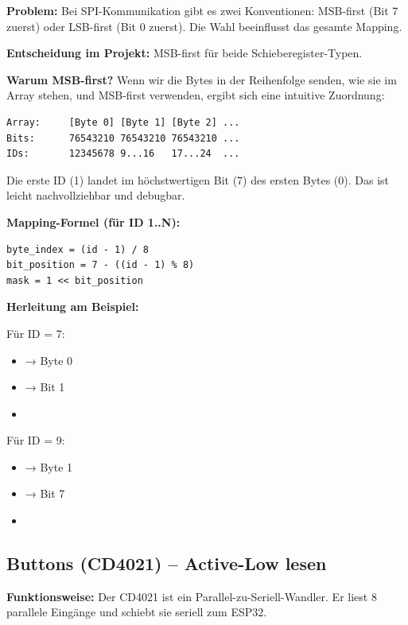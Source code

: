 \textbf{Problem:} Bei SPI-Kommunikation gibt es zwei Konventionen: MSB-first (Bit 7 zuerst) oder LSB-first (Bit 0 zuerst). Die Wahl beeinflusst das gesamte Mapping.

\textbf{Entscheidung im Projekt:} MSB-first für beide Schieberegister-Typen.

\textbf{Warum MSB-first?} Wenn wir die Bytes in der Reihenfolge senden, wie sie im Array stehen, und MSB-first verwenden, ergibt sich eine intuitive Zuordnung:

\begin{lstlisting}[style=wrap,numbers=none]
Array:     [Byte 0] [Byte 1] [Byte 2] ...
Bits:      76543210 76543210 76543210 ...
IDs:       12345678 9...16   17...24  ...
\end{lstlisting}

Die erste ID (1) landet im höchstwertigen Bit (7) des ersten Bytes (0). Das ist leicht nachvollziehbar und debugbar.

\textbf{Mapping-Formel (für ID 1..N):}

\begin{lstlisting}[style=arduino]
byte_index = (id - 1) / 8
bit_position = 7 - ((id - 1) % 8)
mask = 1 << bit_position
\end{lstlisting}

\textbf{Herleitung am Beispiel:}

Für ID = 7:
\begin{itemize}
\item {} → Byte 0
\item {} → Bit 1
\item {}
\end{itemize}

Für ID = 9:
\begin{itemize}
\item {} → Byte 1
\item {} → Bit 7
\item {}
\end{itemize}

\subsection{Buttons (CD4021) – Active-Low lesen}

\textbf{Funktionsweise:} Der CD4021 ist ein Parallel-zu-Seriell-Wandler. Er liest 8 parallele Eingänge und schiebt sie seriell zum ESP32.

